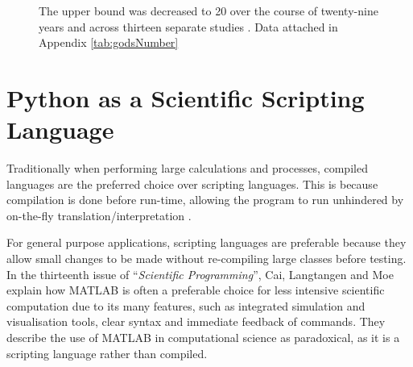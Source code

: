 \documentclass{report}
\newcommand{\tit}[1]{\textit{#1}}
\newcommand{\propernoun}[1]{\enquote{\tit{#1}}}
\begin{document}
   	\begin{figure}[H]
   		\centering
   		\caption{The upper bound was decreased to 20 over the course of twenty-nine years and across thirteen separate studies \cite{Rokicki2010}. Data attached in Appendix \ref{tab:godsNumber}}
		\label{fig:godsnumbergraph}
	\end{figure}

    
    \section{Python as a Scientific Scripting Language}
    Traditionally when performing large calculations and processes, compiled languages are the preferred choice over scripting languages. This is because compilation is done before run-time, allowing the program to run unhindered by on-the-fly translation/interpretation \cite{Cai2005}.
    
    For general purpose applications, scripting languages are preferable because they allow small changes to be made without re-compiling large classes before testing. In the thirteenth issue of \propernoun{Scientific Programming}, Cai, Langtangen and Moe \cite{Cai2005} explain how MATLAB is often a preferable choice for less intensive scientific computation due to its many features, such as integrated simulation and visualisation tools, clear syntax and immediate feedback of commands. They describe the use of MATLAB in computational science as paradoxical, as it is a scripting language rather than compiled.
    
\end{document}
